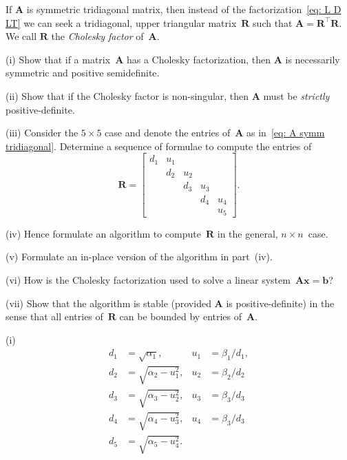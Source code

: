 \begin{Exercises}
\exercise
If $\boldsymbol{A}$ is symmetric tridiagonal matrix, then instead of the 
factorization~\eqref{eq: L D LT} we can seek a tridiagonal, upper triangular
matrix~$\boldsymbol{R}$ such that 
$\boldsymbol{A}=\boldsymbol{R}^\top\boldsymbol{R}$.  We call $\boldsymbol{R}$ 
the \emph{Cholesky factor} of~$\boldsymbol{A}$.
\begin{description}
\item{(i)} Show that if a matrix~$\boldsymbol{A}$ has a Cholesky factorization, 
then $\boldsymbol{A}$ is necessarily symmetric and positive semidefinite.
\item{(ii)} Show that if the Cholesky factor is non-singular, then 
$\boldsymbol{A}$ must be \emph{strictly} positive-definite.
\item{(iii)} Consider the $5\times5$ case and denote the entries 
of~$\boldsymbol{A}$ as in~\eqref{eq: A symm tridiagonal}.  Determine a sequence 
of formulae to compute the entries of
\[
\boldsymbol{R}=\begin{bmatrix}
d_1&u_1&   &   &\\
   &d_2&u_2&   &\\
   &   &d_3&u_3&\\
   &   &   &d_4&u_4\\
   &   &   &   &u_5\end{bmatrix}.
\]
\item{(iv)} Hence formulate an algorithm to compute~$\boldsymbol{R}$ in the 
general, $n\times n$~case.
\item{(v)} Formulate an in-place version of the algorithm in part~(iv).
\item{(vi)} How is the Cholesky factorization used to solve a linear 
system~$\boldsymbol{A}\boldsymbol{x}=\boldsymbol{b}$?
\item{(vii)} Show that the algorithm is stable (provided $\boldsymbol{A}$ is 
positive-definite) in the sense that all entries of~$\boldsymbol{R}$ can be 
bounded by entries of~$\boldsymbol{A}$.
\end{description}
\begin{ans}
(i)
\[
\begin{aligned}
d_1&=\sqrt{\alpha_1},&u_1&=\beta_1/d_1,\\
d_2&=\sqrt{\alpha_2-u_1^2},&u_2&=\beta_2/d_2\\
d_3&=\sqrt{\alpha_3-u_2^2},&u_3&=\beta_3/d_3\\
d_4&=\sqrt{\alpha_4-u_3^2},&u_4&=\beta_3/d_3\\
d_5&=\sqrt{\alpha_5-u_4^2}.
\end{aligned}
\]
\end{ans}



\end{Exercises}
